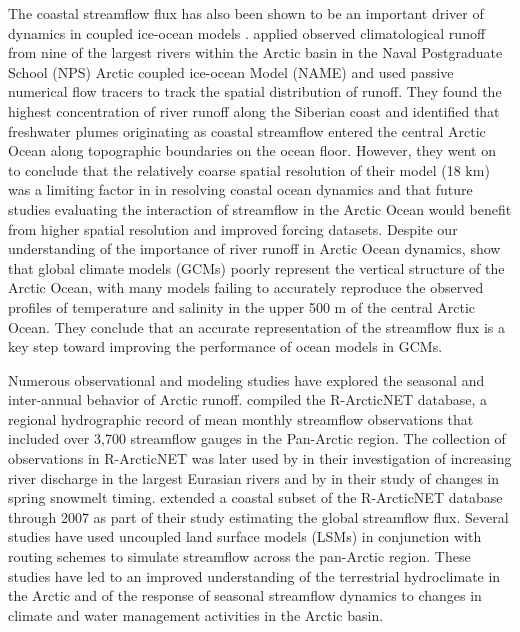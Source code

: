 \documentclass[jgrga, draft]{agutex}
\begin{document}
\begin{article}
The coastal streamflow flux has also been shown to be an important driver of dynamics in coupled ice-ocean models \citep[e.g.][]{Newton_2008,Large_2009,Lique_2015}.
\citet{Newton_2008} applied observed climatological runoff from nine of the largest rivers within the Arctic basin in the Naval Postgraduate School (NPS) Arctic coupled ice-ocean Model (NAME) and used passive numerical flow tracers to track the spatial distribution of runoff.
They found the highest concentration of river runoff along the Siberian coast and identified that freshwater plumes originating as coastal streamflow entered the central Arctic Ocean along topographic boundaries on the ocean floor.
However, they went on to conclude that the relatively coarse spatial resolution of their model (18 km) was a limiting factor in in resolving coastal ocean dynamics and that future studies evaluating the interaction of streamflow in the Arctic Ocean would benefit from higher spatial resolution and improved forcing datasets.
Despite our understanding of the importance of river runoff in Arctic Ocean dynamics, \citet{Nummelin_2015} show that global climate models (GCMs) poorly represent the vertical structure of the Arctic Ocean, with many models failing to accurately reproduce the observed profiles of temperature and salinity in the upper 500 m of the central Arctic Ocean.
They conclude that an accurate representation of the streamflow flux is a key step toward improving the performance of ocean models in GCMs.

Numerous observational and modeling studies have explored the seasonal and inter-annual behavior of Arctic runoff.
\citet{Lammers_2001} compiled the R-ArcticNET database, a regional hydrographic record of mean monthly streamflow observations that included over 3,700 streamflow gauges in the Pan-Arctic region.
The collection of observations in R-ArcticNET was later used by \citet{Shiklomanov_2009} in their investigation of increasing river discharge in the largest Eurasian rivers and by \citet{Tan_2011} in their study of changes in spring snowmelt timing.
\citet{Dai_2009} extended a coastal subset of the R-ArcticNET database through 2007 as part of their study estimating the global streamflow flux.
Several studies \citep{Su_2005,Adam_2007,Slater_2007,Adam_2008,Dai_2009} have used uncoupled land surface models (LSMs) in conjunction with routing schemes to simulate streamflow across the pan-Arctic region.
These studies have led to an improved understanding of the terrestrial hydroclimate in the Arctic and of the response of seasonal streamflow dynamics to changes in climate and water management activities in the Arctic basin.


\end{article}
\end{document}
